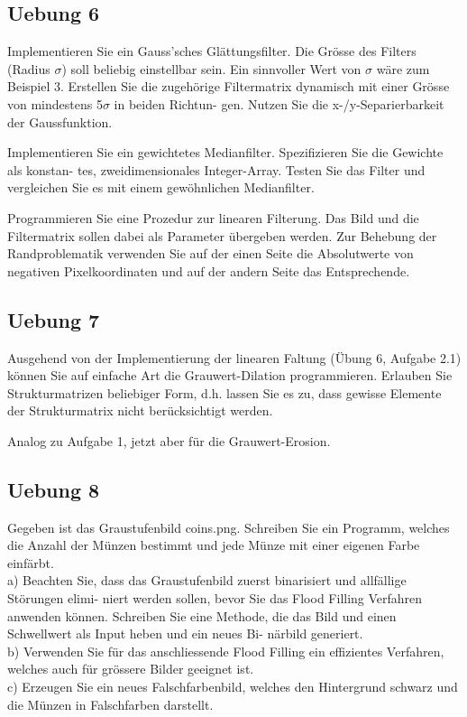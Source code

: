 \documentclass[10pt]{article}
\begin{document}
\subsection{Uebung 6}
Implementieren Sie ein Gauss’sches Glättungsfilter. Die Grösse des Filters (Radius $\sigma$) soll
beliebig einstellbar sein. Ein sinnvoller Wert von $\sigma$ wäre zum Beispiel 3. Erstellen Sie die
zugehörige Filtermatrix dynamisch mit einer Grösse von mindestens 5$\sigma$ in beiden Richtun-
gen. Nutzen Sie die x-/y-Separierbarkeit der Gaussfunktion.

Implementieren Sie ein gewichtetes Medianfilter. Spezifizieren Sie die Gewichte als konstan-
tes, zweidimensionales Integer-Array. Testen Sie das Filter und vergleichen Sie es mit einem
gewöhnlichen Medianfilter.

Programmieren Sie eine Prozedur zur linearen Filterung. Das Bild und die Filtermatrix sollen
dabei als Parameter übergeben werden. Zur Behebung der Randproblematik verwenden Sie
auf der einen Seite die Absolutwerte von negativen Pixelkoordinaten und auf der andern
Seite das Entsprechende.

\subsection{Uebung 7}
Ausgehend von der Implementierung der linearen Faltung (Übung 6, Aufgabe 2.1) können
Sie auf einfache Art die Grauwert-Dilation programmieren. Erlauben Sie Strukturmatrizen
beliebiger Form, d.h. lassen Sie es zu, dass gewisse Elemente der Strukturmatrix nicht
berücksichtigt werden.

Analog zu Aufgabe 1, jetzt aber für die Grauwert-Erosion.

\subsection{Uebung 8}
Gegeben ist das Graustufenbild coins.png. Schreiben Sie ein Programm, welches die Anzahl
der Münzen bestimmt und jede Münze mit einer eigenen Farbe einfärbt.\\
a) Beachten Sie, dass das Graustufenbild zuerst binarisiert und allfällige Störungen elimi-
niert werden sollen, bevor Sie das Flood Filling Verfahren anwenden können. Schreiben
Sie eine Methode, die das Bild und einen Schwellwert als Input heben und ein neues Bi-
närbild generiert.\\
b) Verwenden Sie für das anschliessende Flood Filling ein effizientes Verfahren, welches
auch für grössere Bilder geeignet ist.\\
c) Erzeugen Sie ein neues Falschfarbenbild, welches den Hintergrund schwarz und die
Münzen in Falschfarben darstellt.

\end{document}

